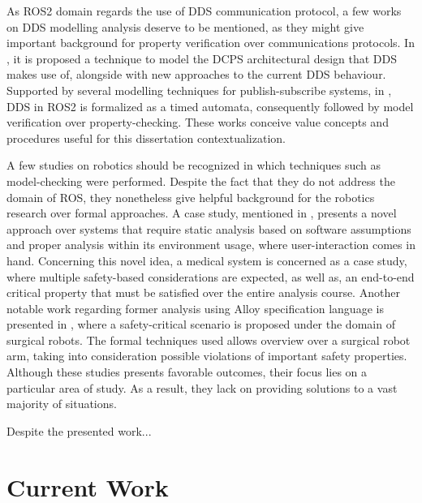 As ROS2 domain regards the use of DDS communication protocol, a few works on DDS modelling analysis deserve to be mentioned, as they might give important background for property verification over communications protocols. In , it is proposed a technique to model the DCPS architectural design that DDS makes use of, alongside with new approaches to the current DDS behaviour. Supported by several modelling techniques for publish-subscribe systems, in , DDS in ROS2 is formalized as a timed automata, consequently followed by model verification over property-checking. These works conceive value concepts and procedures useful for this dissertation contextualization.

A few studies on robotics should be recognized in which techniques such as model-checking were performed. Despite the fact that they do not address the domain of ROS, they nonetheless give helpful background for the robotics research over formal approaches. A case study, mentioned in , presents a novel approach over systems that require static analysis based on software assumptions and proper analysis within its environment usage, where user-interaction comes in hand. Concerning this novel idea, a medical system is concerned as a case study, where multiple safety-based considerations are expected, as well as, an end-to-end critical property that must be satisfied over the entire analysis course. Another notable work regarding former analysis using Alloy specification language is presented in , where a safety-critical scenario is proposed under the domain of surgical robots. The formal techniques used allows overview over a surgical robot arm, taking into consideration possible violations of important safety properties. Although these studies presents favorable outcomes, their focus lies on a particular area of study. As a result, they lack on providing solutions to a vast majority of situations.

Despite the presented work... 

\section{Current Work}\label{c:currWork}